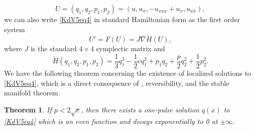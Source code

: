\documentclass[10pt,reqno]{amsart}
\theoremstyle{plain}
\newtheorem{theorem}{Theorem}
\theoremstyle{definition}
\theoremstyle{remark}
\numberwithin{theorem}{section}
\numberwithin{equation}{section}
\begin{document}
\begin{equation}\label{KdV5U}
U = (q_1, q_2, p_1, p_2) = (u, u_x, -u_{xxx} + u_x, u_{xx}),
\end{equation}
we can also write \cref{KdV5eq4} in standard Hamiltonian form as the first order system
\begin{equation}\label{KdV5ham2}
U' = F(U) = J \nabla \tilde{H}(U),
\end{equation}
where $J$ is the standard $4 \times 4$ symplectic matrix and
\begin{equation}
\tilde{H}(q_1, q_2, p_1, p_2) = \frac{1}{3}q_1^3 - \frac{1}{2}c q_1^2 + p_1 q_2 + \frac{p}{2}q_2^2 + \frac{1}{2}p_2^2.
\end{equation}
We have the following theorem concerning the existence of localized solutions to \cref{KdV5eq4}, which is a direct consequence of \cite{Groves1998}, reversibility, and the stable manifold theorem.

\begin{theorem}\label{KdV1pulse}
If $p < 2 \sqrt{c}$, then there exists a one-pulse solution $q(x)$ to \cref{KdV5eq4} which is an even function and decays exponentially to 0 at $\pm \infty$.
\end{theorem}
\end{document}
